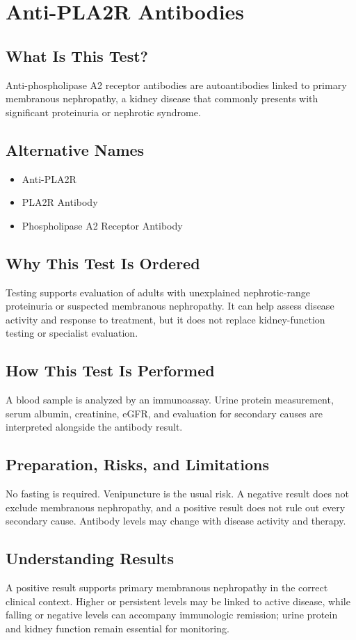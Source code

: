 \chapter{Anti-PLA2R Antibodies}

\section*{What Is This Test?}
Anti-phospholipase A2 receptor antibodies are autoantibodies linked to primary membranous nephropathy, a kidney disease that commonly presents with significant proteinuria or nephrotic syndrome.

\section*{Alternative Names}
\begin{itemize}
  \item Anti-PLA2R
  \item PLA2R Antibody
  \item Phospholipase A2 Receptor Antibody
\end{itemize}
\section*{Why This Test Is Ordered}
Testing supports evaluation of adults with unexplained nephrotic-range proteinuria or suspected membranous nephropathy. It can help assess disease activity and response to treatment, but it does not replace kidney-function testing or specialist evaluation.

\section*{How This Test Is Performed}
A blood sample is analyzed by an immunoassay. Urine protein measurement, serum albumin, creatinine, eGFR, and evaluation for secondary causes are interpreted alongside the antibody result.

\section*{Preparation, Risks, and Limitations}
No fasting is required. Venipuncture is the usual risk. A negative result does not exclude membranous nephropathy, and a positive result does not rule out every secondary cause. Antibody levels may change with disease activity and therapy.

\section*{Understanding Results}
A positive result supports primary membranous nephropathy in the correct clinical context. Higher or persistent levels may be linked to active disease, while falling or negative levels can accompany immunologic remission; urine protein and kidney function remain essential for monitoring.

